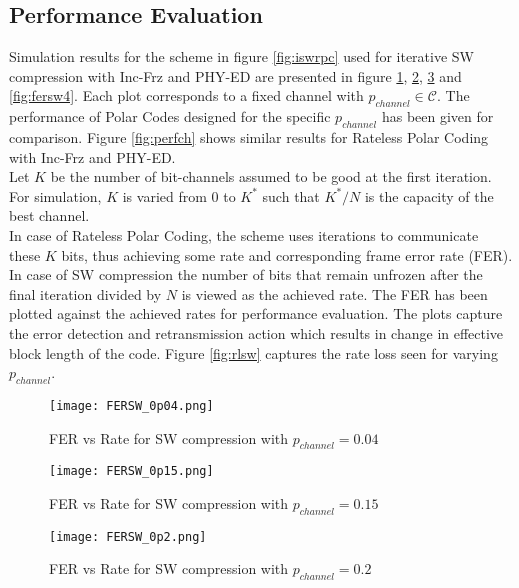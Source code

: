 \documentclass[
11pt, %
a4paper, %
oneside, %
headinclude,footinclude, %
BCOR5mm, %
]{scrartcl}
\begin{document}
\clearpage
\subsection{Performance Evaluation}
Simulation results for the scheme in figure \ref{fig:iswrpc} used for iterative SW compression with Inc-Frz and PHY-ED are presented in figure \ref{fig:fersw1}, \ref{fig:fersw2}, \ref{fig:fersw3} and \ref{fig:fersw4}.
Each plot corresponds to a fixed channel with $p_{channel} \in \mathcal{C}$. The performance of Polar Codes designed for the specific $p_{channel}$ has been given for comparison. Figure \ref{fig:perfch} shows similar results for Rateless Polar Coding with Inc-Frz and PHY-ED.\\
Let $K$ be the number of bit-channels assumed to be good at the first iteration. For simulation, $K$ is varied from $0$ to $K^*$ such that $K^*/N$ is the capacity of the best channel.\\ In case of Rateless Polar Coding, the scheme uses iterations to communicate these $K$ bits, thus achieving some rate and corresponding frame error rate (FER). In case of SW compression the number of bits that remain unfrozen after the final iteration divided by $N$ is viewed as the achieved rate. The FER has been plotted against the achieved rates for performance evaluation. The plots capture the error detection and retransmission action which results in change in effective block length of the code. Figure \ref{fig:rlsw} captures the rate loss seen for varying $p_{channel}$.  
\begin{figure}[h]
 \begin{center}
    \texttt{[image: FERSW\_0p04.png]}
  \end{center}
  \caption{FER vs Rate for SW compression with $p_{channel}=0.04$}
  \label{fig:fersw1}
\end{figure}
\begin{figure}[h]
 \begin{center}
    \texttt{[image: FERSW\_0p15.png]}
  \end{center}
  \caption{FER vs Rate for SW compression with $p_{channel}=0.15$ }
  \label{fig:fersw2}
\end{figure}
\begin{figure}[h]
 \begin{center}
    \texttt{[image: FERSW\_0p2.png]}
  \end{center}
  \caption{FER vs Rate for SW compression with $p_{channel}=0.2$ }
  \label{fig:fersw3}
\end{figure}
\end{document}
